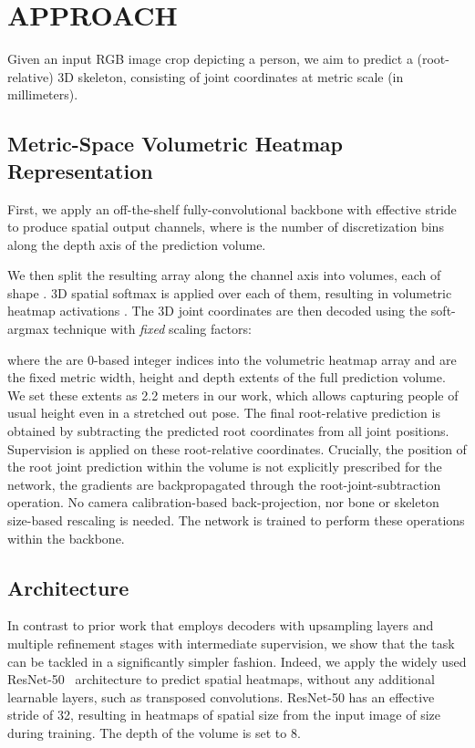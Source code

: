 \section{\uppercase{Approach}}
Given an input RGB image crop  depicting a person, we aim to predict a (root-relative) 3D skeleton, consisting of  joint coordinates  at metric scale (\ie in millimeters).

\subsection{Metric-Space Volumetric Heatmap Representation}
First, we apply an off-the-shelf fully-convolutional backbone with effective stride  to produce  spatial output channels, where  is the number of discretization bins along the depth axis of the prediction volume.

We then split the resulting array along the channel axis into  volumes, each of shape .
3D spatial softmax is applied over each of them, resulting in volumetric heatmap activations .
The 3D joint coordinates are then decoded using the soft-argmax technique with \emph{fixed} scaling factors:

where the  are 0-based integer indices into the volumetric heatmap array and  are the fixed metric width, height and depth extents of the full prediction volume.
We set these extents as 2.2 meters in our work, which allows capturing people of usual height even in a stretched out pose.
The final root-relative prediction is obtained by subtracting the predicted root coordinates from all joint positions.
Supervision is applied on these root-relative coordinates.
Crucially, the position of the root joint prediction within the volume is not explicitly prescribed for the network, the gradients are backpropagated through the root-joint-subtraction operation.
No camera calibration-based back-projection, nor bone or skeleton size-based rescaling is needed.
The network is trained to perform these operations within the backbone.
\subsection{Architecture}
In contrast to prior work that employs decoders with upsampling layers and multiple refinement stages with intermediate supervision, we show that the task can be tackled in a significantly simpler fashion.
Indeed, we apply the widely used ResNet-50~\cite{He16ECCV} architecture to predict spatial heatmaps, without any additional learnable layers, such as transposed convolutions.
ResNet-50 has an effective stride of 32, resulting in heatmaps of spatial size  from the input image of size  during training.
The depth of the volume is set to 8.

